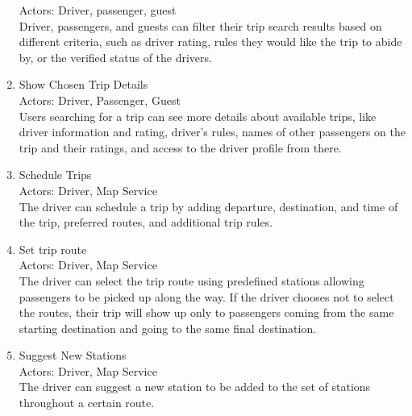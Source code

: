 \documentclass[a4paper, 12pt]{report} %
\begin{document}
\begin{enumerate}
                    Actors: Driver, passenger, guest \\
                    Driver, passengers, and guests can filter their trip search results based on different criteria, such as driver rating, rules they would like the trip to abide by, or the verified status of the drivers.
                \item Show Chosen Trip Details \\ 
                    Actors: Driver, Passenger, Guest \\ 
                    Users searching for a trip can see more details about available trips, like driver information and rating, driver’s rules, names of other passengers on the trip and their ratings, and access to the driver profile from there.
                \item Schedule Trips \\
                    Actors: Driver, Map Service \\
                    The driver can schedule a trip by adding departure, destination, and time of the trip, preferred routes, and additional trip rules.
                \item Set trip route \\
                    Actors: Driver, Map Service \\
                    The driver can select the trip route using predefined stations allowing passengers to be picked up along the way. If the driver chooses not to select the routes, their trip will show up only to passengers coming from the same starting destination and going to the same final destination.
                \item Suggest New Stations \\
                    Actors: Driver, Map Service \\
                    The driver can suggest a new station to be added to the set of stations throughout a certain route.
                    

\end{enumerate}
\end{document}

